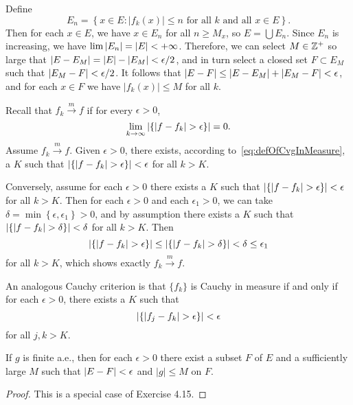 
\begin{exercise}{4.15}
  Define
  \[
    E_n = \left\{ x \in E : \lvert f_k(x) \rvert \le n
    \text{ for all $k$ and all $x \in E$} \right\}.
  \]
  Then for each $x \in E$,
  we have $x \in E_n$ for all $n \ge M_x$,
  so $E = \bigcup E_n$.
  Since $E_n$ is increasing,
  we have $\lim \left\vert E_n\right\vert = \left\vert E\right\vert < +\infty$.
  Therefore, we can select $M \in \mathbb{Z}^+$ so large that
  $\left\vert E - E_M\right\vert = \left\vert E\right\vert - \left\vert E_M\right\vert < \epsilon/2$,
  and in turn select a closed set $F \subset E_M$ such that
  $\left\vert E_M - F\right\vert < \epsilon/2$.
  It follows that $\left\vert E - F\right\vert \le \left\vert E - E_M\right\vert + \left\vert E_M - F\right\vert < \epsilon$,
  and for each $x \in F$ we have
  $\lvert f_k(x) \rvert \le M$ for all $k$.
\end{exercise}

\begin{exercise}{4.16}
  Recall that $f_k \xrightarrow{m} f$ if for every $\epsilon > 0$,
  \begin{equation}
    \lim_{k \rightarrow \infty} \left\vert\left\{ \lvert f - f_k \rvert > \epsilon \right\}\right\vert = 0.
    \label{eq:defOfCvgInMeasure}
  \end{equation}
  Assume $f_k \xrightarrow{m} f$.
  Given $\epsilon > 0$,
  there exists, according to~\eqref{eq:defOfCvgInMeasure}, a $K$ such that
  $\left\vert\left\{ \lvert f - f_k \rvert > \epsilon \right\}\right\vert < \epsilon$
  for all $k > K$.

  Conversely, assume for each $\epsilon > 0$ there exists a $K$ such that
  $\left\vert\left\{ \lvert f - f_k \rvert > \epsilon \right\}\right\vert < \epsilon$
  for all $k > K$.
  Then for each $\epsilon > 0$ and each $\epsilon_1 > 0$,
  we can take $\delta = \min \left\{ \epsilon, \epsilon_1 \right\} > 0$,
  and by assumption there exists a $K$ such that
  $\left\vert\left\{ \lvert f - f_k \rvert > \delta \right\}\right\vert < \delta$
  for all $k > K$.
  Then
  \[
    \left\vert\left\{ \lvert f - f_k \rvert > \epsilon \right\}\right\vert
    \le \left\vert\left\{ \lvert f - f_k \rvert > \delta \right\}\right\vert
    < \delta \le \epsilon_1
  \]
  for all $k > K$, which shows exactly $f_k \xrightarrow{m} f$.

  An analogous Cauchy criterion is that
  $\{f_k\}$ is Cauchy in measure if and only if
  for each $\epsilon > 0$,
  there exists a $K$ such that
  \[
    \left\vert\left\{ \lvert f_j - f_k \rvert > \epsilon \right\}\right\vert < \epsilon
  \]
  for all $j, k > K$.
\end{exercise}

\begin{lemma}
  If $g$ is finite a.e.,
  then for each $\epsilon > 0$
  there exist a subset $F$ of $E$ and a sufficiently large $M$ such that
  $\left\vert E - F\right\vert < \epsilon$ and $\lvert g \rvert \le M$ on $F$.
\end{lemma}
\begin{proof}
  This is a special case of Exercise 4.15.
\end{proof}

